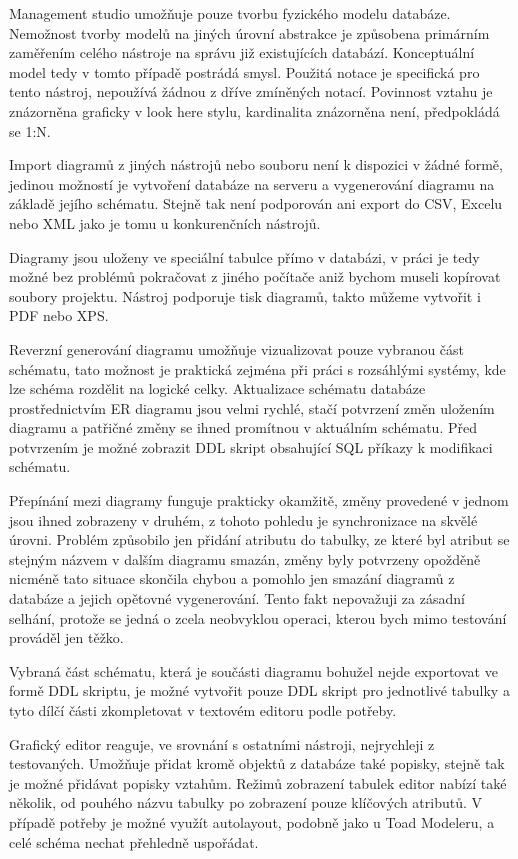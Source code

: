 \documentclass[czech,bachelor,public,dept460,male,oneside]{diploma}
\begin{document}
		Management studio umožňuje pouze tvorbu fyzického modelu databáze. Nemožnost tvorby modelů na jiných úrovní abstrakce je způsobena primárním zaměřením celého nástroje na správu již existujících databází. Konceptuální model tedy v tomto případě postrádá smysl. Použitá notace je specifická pro tento nástroj, nepoužívá žádnou z dříve zmíněných notací. Povinnost vztahu je znázorněna graficky v look here stylu, kardinalita znázorněna není, předpokládá se 1:N. 
		
		Import diagramů z jiných nástrojů nebo souboru není k dispozici v žádné formě, jedinou možností je vytvoření databáze na serveru a vygenerování diagramu na základě jejího schématu. Stejně tak není podporován ani export do CSV, Excelu nebo XML jako je tomu u konkurenčních nástrojů. 
		
		Diagramy jsou uloženy ve speciální tabulce přímo v databázi, v práci je tedy možné bez problémů pokračovat z jiného počítače aniž bychom museli kopírovat soubory projektu. Nástroj podporuje tisk diagramů, takto můžeme vytvořit i PDF nebo XPS.
		
		Reverzní generování diagramu umožňuje vizualizovat pouze vybranou část schématu, tato možnost je praktická zejména při práci s rozsáhlými systémy, kde lze schéma rozdělit na logické celky. Aktualizace schématu databáze prostřednictvím ER diagramu jsou velmi rychlé, stačí potvrzení změn uložením diagramu a patřičné změny se ihned promítnou v aktuálním schématu. Před potvrzením je možné zobrazit DDL skript obsahující SQL příkazy k modifikaci schématu. 
		
		Přepínání mezi diagramy funguje prakticky okamžitě, změny provedené v jednom jsou ihned zobrazeny v druhém, z tohoto pohledu je synchronizace na skvělé úrovni. Problém způsobilo jen přidání atributu do tabulky, ze které byl atribut se stejným názvem v dalším diagramu smazán, změny byly potvrzeny opožděně nicméně tato situace skončila chybou a pomohlo jen smazání diagramů z databáze a jejich opětovné vygenerování. Tento fakt nepovažuji za zásadní selhání, protože se jedná o zcela neobvyklou operaci, kterou bych mimo testování prováděl jen těžko.
		
		Vybraná část schématu, která je součásti diagramu bohužel nejde exportovat ve formě DDL skriptu, je možné vytvořit pouze DDL skript pro jednotlivé tabulky a tyto dílčí části zkompletovat v textovém editoru podle potřeby.
		
		Grafický editor reaguje, ve srovnání s ostatními nástroji, nejrychleji z testovaných. Umožňuje přidat kromě objektů z databáze také popisky, stejně tak je možné přidávat popisky vztahům. Režimů zobrazení tabulek editor nabízí také několik, od pouhého názvu tabulky po zobrazení pouze klíčových atributů. V případě potřeby je možné využít autolayout, podobně jako u Toad Modeleru, a celé schéma nechat přehledně uspořádat. 
		
\end{document}
